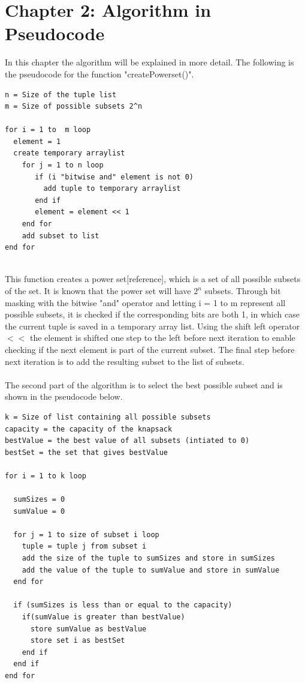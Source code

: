 \documentclass{article}
\begin{document}
\section*{Chapter 2: Algorithm in Pseudocode}
In this chapter the algorithm will be explained in more detail. The following is the pseudocode for the function "createPowerset()". \newline

\begin{verbatim}
n = Size of the tuple list 	
m = Size of possible subsets 2^n

for i = 1 to  m loop
  element = 1  
  create temporary arraylist  
    for j = 1 to n loop
       if (i "bitwise and" element is not 0)
         add tuple to temporary arraylist
       end if
       element = element << 1
    end for
    add subset to list
end for
 
\end{verbatim}

\noindent This function creates a power set[reference], which is a set of all possible subsets of the set. It is known that the power set will have $2^n$ subsets. Through bit masking with the bitwise "and" operator and letting i = 1 to m represent all possible subsets, it is checked if the corresponding bits are both 1, in which case the current tuple is saved in a temporary array list. Using the shift left operator $<<$ the element is shifted one step to the left before next iteration to enable checking if the next element is part of the current subset. The final step before next iteration is to add the resulting subset to the list of subsets. \\ \\ 

The second part of the algorithm is to select the best possible subset and is shown in the pseudocode below.\\

\begin{verbatim}
k = Size of list containing all possible subsets
capacity = the capacity of the knapsack
bestValue = the best value of all subsets (intiated to 0)
bestSet = the set that gives bestValue

for i = 1 to k loop

  sumSizes = 0
  sumValue = 0

  for j = 1 to size of subset i loop
    tuple = tuple j from subset i
    add the size of the tuple to sumSizes and store in sumSizes
    add the value of the tuple to sumValue and store in sumValue
  end for

  if (sumSizes is less than or equal to the capacity)
    if(sumValue is greater than bestValue)
      store sumValue as bestValue
      store set i as bestSet
    end if
  end if
end for
\end{verbatim}
\end{document}
